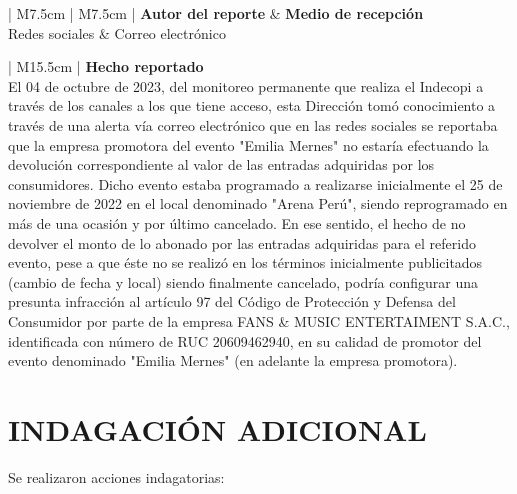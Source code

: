 \documentclass[
  11pt,
  a4paper,
  oneside]{article}
\begin{document}
\setlength{\arrayrulewidth}{0.35mm} 
\begin{table}
\setlength\extrarowheight{3pt}
\begin{tabular}
  { 
  | M{7.5cm} 
  | M{7.5cm} 
  |} 
  \hline 
  \textbf{Autor del reporte} & \textbf{Medio de recepción}  \\ [10pt]
  \hline 
   Redes sociales & Correo electrónico \\ [10pt]
  \hline
  \end{tabular}
\end{table}

\setlength{\arrayrulewidth}{0.35mm} 
\begin{table}
\setlength\extrarowheight{3pt}
\begin{tabular}
  { 
  | M{15.5cm}
  |} 
  \hline 
  \textbf{Hecho reportado}  \\ [10pt]
  \hline 
   El 04 de octubre de 2023, del monitoreo permanente que realiza el Indecopi a través de los canales a los que tiene acceso, esta Dirección tomó conocimiento a través de una alerta vía correo electrónico que en las redes sociales se reportaba que la empresa promotora del evento  "Emilia Mernes" no estaría efectuando la devolución correspondiente al valor de las entradas adquiridas por los consumidores. Dicho evento estaba programado a realizarse inicialmente el 25 de noviembre de 2022 en el local denominado "Arena Perú", siendo reprogramado en más de una ocasión y por último cancelado. En ese sentido, el hecho de no devolver el monto de lo abonado por las entradas adquiridas para el referido evento, pese a que éste no se realizó en los términos inicialmente publicitados (cambio de fecha y local) siendo finalmente cancelado, podría configurar una presunta infracción al artículo 97 del Código de Protección y Defensa del Consumidor por parte de la empresa FANS & MUSIC ENTERTAIMENT S.A.C., identificada con número de RUC 20609462940, en su calidad de promotor del evento denominado "Emilia Mernes" (en adelante la empresa promotora). \\ [10pt]
  \hline
  \end{tabular}
\end{table}

\section{INDAGACIÓN ADICIONAL}\label{indagaciuxf3n-adicional}

Se realizaron acciones indagatorias: \setlength{\arrayrulewidth}{0.35mm}
\end{document}
